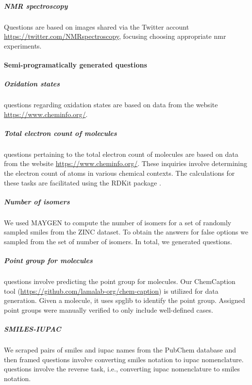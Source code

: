 \documentclass[11pt, oneside]{article}
\begin{document}
\begin{refsection}
\subparagraph{NMR spectroscopy}
Questions are based on images shared via the Twitter account \url{https://twitter.com/NMRspectroscopy}, focusing choosing appropriate \gls{nmr} experiments.


\paragraph{Semi-programatically generated questions}

\subparagraph{Oxidation states}
 questions regarding oxidation states are based on data from the website \url{https://www.cheminfo.org/}. 

\subparagraph{Total electron count of molecules}
 questions pertaining to the total electron count of molecules are based on data from the website \url{https://www.cheminfo.org/}. 
These inquiries involve determining the electron count of atoms in various chemical contexts. The calculations for these tasks are facilitated using the RDKit package \autocite{rdkit}.

\subparagraph{Number of isomers}
We used MAYGEN\autocite{Yirik_2021} to compute the number of isomers for a set of randomly sampled \gls{smiles} from the ZINC dataset.\autocite{Irwin_2012}
To obtain the answers for false options we sampled from the set of number of isomers. In total, we generated  questions.

\subparagraph{Point group for molecules}
 questions involve predicting the point group for molecules. Our ChemCaption tool (\url{https://github.com/lamalab-org/chem-caption}) is utilized for data generation. 
Given a molecule, it uses spglib\autocite{spglib} to identify the point group. 
Assigned point groups were manually verified to only include well-defined cases.

\subparagraph{SMILES-IUPAC}
We scraped pairs of \gls{smiles} and \gls{iupac} names from the PubChem database \autocite{pubchem} and then framed  questions involve converting \gls{smiles} notation to \gls{iupac} nomenclature.
 questions involve the reverse task, i.e., converting \gls{iupac} nomenclature to \gls{smiles} notation.



\end{refsection}
\end{document}
